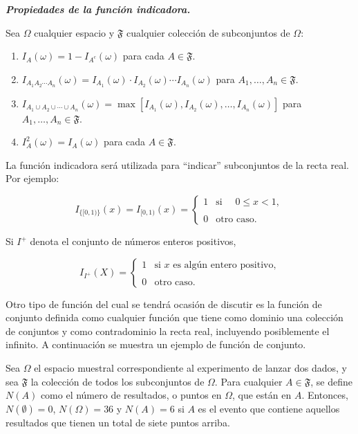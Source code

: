 \documentclass[
  us-letterpaper,
]{scrreprt}
\theoremstyle{plain}
\theoremstyle{definition}
\theoremstyle{definition}
\theoremstyle{plain}
\theoremstyle{remark}
\begin{document}
\textbf{\emph{Propiedades de la función indicadora.}}

Sea \(\Omega\) cualquier espacio y \(\mathfrak{F}\) cualquier colección
de subconjuntos de \(\Omega\):

\begin{enumerate}
\def\labelenumi{\roman{enumi}.}
\item
  \(I_A(\omega)= 1- I_{A^c}(\omega)\) para cada \(A\in \mathfrak{F}\).
\item
  \(I_{A_1A_2\cdots A_n}(\omega)= I_{A_1}(\omega)\cdot I_{A_2}(\omega)\cdots I_{A_n}(\omega)\)
  para \(A_1,\ldots, A_n\in \mathfrak{F}\).
\item
  \(I_{A_1\cup A_2\cup\cdots\cup A_n}(\omega)= \max{[I_{A_1}(\omega), I_{A_2}(\omega),\ldots, I_{A_n}(\omega)]}\)
  para \(A_1, \ldots, A_n \in\mathfrak{F}\).
\item
  \(I_A^2(\omega)= I_A(\omega)\) para cada \(A\in\mathfrak{F}\).
\end{enumerate}

La función indicadora será utilizada para ``indicar'' subconjuntos de la
recta real. Por ejemplo:

\[I_{\{[0,1)\}}(x)= I_{[0,1)}(x)=\begin{cases} 1 & \text{si }\quad 0\leq x<1,\\ \\ 0 & \text{otro caso.} \end{cases} \]

Si \(I^+\) denota el conjunto de números enteros positivos,

\[ I_{I^+}(X)=\begin{cases} 1 & \text{si $x$ es algún entero positivo,}\\ \\ 0 & \text{otro caso.}\end{cases}\]

Otro tipo de función del cual se tendrá ocasión de discutir es la
función de conjunto definida como cualquier función que tiene como
dominio una colección de conjuntos y como contradominio la recta real,
incluyendo posiblemente el infinito. A continuación se muestra un
ejemplo de función de conjunto.

\begin{tcolorbox}[enhanced jigsaw, breakable, colbacktitle=quarto-callout-caution-color!10!white, rightrule=.15mm, toptitle=1mm, colback=white, left=2mm, colframe=quarto-callout-caution-color-frame, bottomtitle=1mm, opacitybacktitle=0.6, leftrule=.75mm, arc=.35mm, title={Ejemplo}, coltitle=black, titlerule=0mm, opacityback=0, bottomrule=.15mm, toprule=.15mm]

Sea \(\Omega\) el espacio muestral correspondiente al experimento de
lanzar dos dados, y sea \(\mathfrak{F}\) la colección de todos los
subconjuntos de \(\Omega\). Para cualquier \(A\in\mathfrak{F}\), se
define \(N(A)\) como el número de resultados, o puntos en \(\Omega\),
que están en \(A\). Entonces, \(N(\emptyset)=0\), \(N(\Omega)=36\) y
\(N(A)=6\) si \(A\) es el evento que contiene aquellos resultados que
tienen un total de siete puntos arriba.

\end{tcolorbox}
\end{document}
